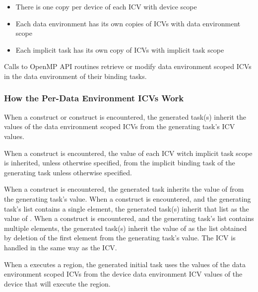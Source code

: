 \linenumbers

\descr
\begin{itemize}
\item There is one copy per device of each ICV with device scope

\item Each data environment has its own copies of ICVs with data environment scope

\item Each implicit task has its own copy of ICVs with implicit task scope
\end{itemize}

Calls to OpenMP API routines retrieve or modify data environment scoped ICVs in the
data environment of their binding tasks.










\subsubsection{How the Per-Data Environment ICVs Work}
\label{subsubsec:How the Per-Data Environment ICVs Work}
When a  construct or  construct is encountered, the generated task(s)
inherit the values of the data environment scoped ICVs from the generating task's ICV
values.

When a  construct is encountered, the value of each ICV witch implicit task scope is inherited, unless otherwise specified, from the implicit binding task of the generating task unless otherwise specified.

When a  construct is encountered, the generated task inherits the value of
 from the generating task's  value. When a 
construct is encountered, and the generating task's  list contains a single
element, the generated task(s) inherit that list as the value of . When a
 construct is encountered, and the generating task's  list contains
multiple elements, the generated task(s) inherit the value of  as the list
obtained by deletion of the first element from the generating task's  value.
The  ICV is handled in the same way as the  ICV.

When a  executes a  region, the generated initial task uses the values of the data environment scoped ICVs from the device data environment ICV values of the device that will execute the region.

